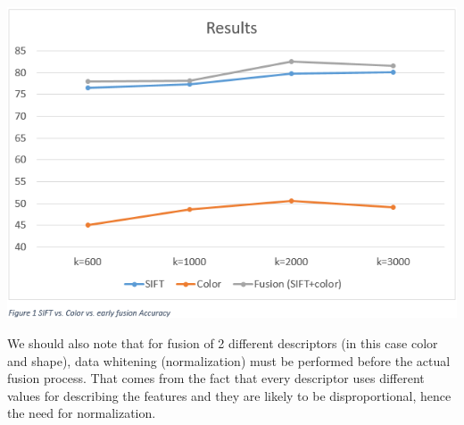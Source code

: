 \centerline{\includegraphics[scale=0.8]{figures/EF.png}}

\par	We should also note that for fusion of 2 different descriptors (in this case color and shape), data whitening (normalization) must be performed before the actual fusion process. That comes from the fact that every descriptor uses different values for describing the features and they are likely to be disproportional, hence the need for normalization.

